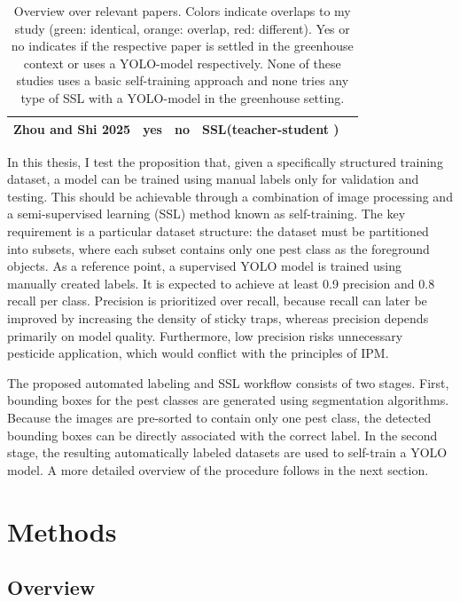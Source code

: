 \documentclass[12pt, a4paper]{article}
\begin{document}
\begin{table}[!t]
{\begin{tabularx}{\textwidth}{l c c c l}
Zhou and Shi 2025 \cite{zhou_perceptive_2025} 
& \cellcolor{green!40}yes & \cellcolor{red!40}no & \cellcolor{orange!40} SSL(teacher-student ) \\

\hline
\end{tabularx}
}
\caption{Overview over relevant papers. Colors indicate overlaps to my study (green: identical, orange: overlap, red: different). Yes or no indicates if the respective paper is settled in the greenhouse context or uses a YOLO-model respectively. None of these studies uses a basic self-training approach and none tries any type of SSL with a YOLO-model in the greenhouse setting.}
\label{tab:literature-overview}
\end{table}
 
In this thesis, I test the proposition that, given a specifically structured training dataset, a model can be trained using manual labels only for validation and testing. This should be achievable through a combination of image processing and a semi-supervised learning (SSL) method known as self-training. The key requirement is a particular dataset structure: the dataset must be partitioned into subsets, where each subset contains only one pest class as the foreground objects.
As a reference point, a supervised YOLO model is trained using manually created labels. It is expected to achieve at least 0.9 precision and 0.8 recall per class. Precision is prioritized over recall, because recall can later be improved by increasing the density of sticky traps, whereas precision depends primarily on model quality. Furthermore, low precision risks unnecessary pesticide application, which would conflict with the principles of IPM.

The proposed automated labeling and SSL workflow consists of two stages. First, bounding boxes for the pest classes are generated using segmentation algorithms. Because the images are pre-sorted to contain only one pest class, the detected bounding boxes can be directly associated with the correct label. In the second stage, the resulting automatically labeled datasets are used to self-train a YOLO model. A more detailed overview of the procedure follows in the next section.

\section {Methods}

\subsection{Overview}
\end{document}

